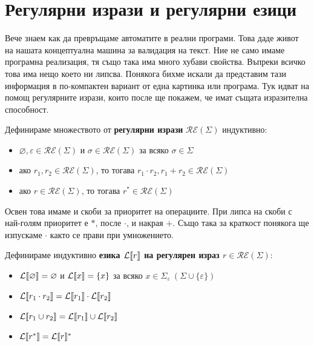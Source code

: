 \section{Регулярни изрази и регулярни езици}

Вече знаем как да превръщаме автоматите в реални програми.
Това даде живот на нашата концептуална машина за валидация на текст.
Ние не само имаме програмна реализация, тя също така има много хубави свойства.
Въпреки всичко това има нещо което ни липсва.
Понякога бихме искали да представим тази информация в по-компактен вариант от една картинка или програма.
Тук идват на помощ регулярните изрази, които после ще покажем, че имат същата изразителна способност.

\begin{definition}
    Дефинираме множеството от \textbf{регулярни изрази} $\mathcal{RE}(\Sigma)$ индуктивно:
    \begin{itemize}
        \item $\varnothing, \varepsilon \in \mathcal{RE}(\Sigma)$ и $\sigma \in \mathcal{RE}(\Sigma)$ за всяко $\sigma \in \Sigma$
        \item ако $r_1, r_2 \in \mathcal{RE}(\Sigma)$, то тогава $r_1 \cdot r_2, r_1 + r_2 \in \mathcal{RE}(\Sigma)$
        \item ако $r \in \mathcal{RE}(\Sigma)$, то тогава $r^* \in \mathcal{RE}(\Sigma)$
    \end{itemize}
\end{definition}

\begin{remark}
    Освен това имаме и скоби за приоритет на операциите.
    При липса на скоби с най-голям приоритет е $*$, после $\cdot$, и накрая $+$.
    Също така за краткост понякога ще изпускаме $\cdot$ както се прави при умножението.
\end{remark}

\begin{definition}
    Дефинираме индуктивно \textbf{езика $\mathcal{L}\llbracket r \rrbracket$ на регулярен израз $r \in \mathcal{RE}(\Sigma)$}:
    \begin{itemize}
        \item $\mathcal{L}\llbracket \varnothing \rrbracket = \varnothing$ и $\mathcal{L}\llbracket x \rrbracket = \{ x \}$ за всяко $x \in \Sigma_{\varepsilon} \: (\Sigma \cup \{ \varepsilon \})$
        \item $\mathcal{L}\llbracket r_1 \cdot r_2 \rrbracket = \mathcal{L}\llbracket r_1 \rrbracket \cdot \mathcal{L}\llbracket r_2 \rrbracket$
        \item $\mathcal{L}\llbracket r_1 \cup r_2 \rrbracket = \mathcal{L}\llbracket r_1 \rrbracket \cup \mathcal{L}\llbracket r_2 \rrbracket$
        \item $\mathcal{L}\llbracket r^* \rrbracket = \mathcal{L}\llbracket r \rrbracket^*$
    \end{itemize}
\end{definition}

